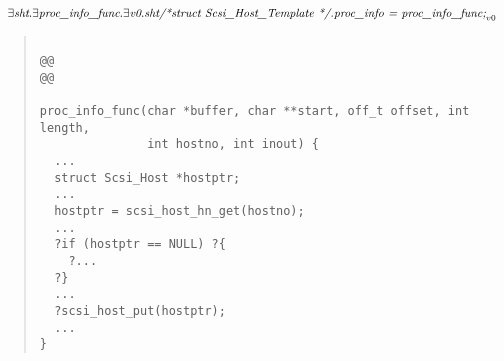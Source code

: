\documentclass{article}
\newcommand{\mita}[1]{\mbox{\it{{#1}}}}
\begin{document}
\[\begin{array}{l}
\exists \mita{sht} . \exists \mita{proc\_info\_func} . \exists \mita{v0} . \mita{sht/*struct Scsi\_Host\_Template */.proc\_info = proc\_info\_func;}_{v0}
\end{array}\]

\begin{quote}\begin{verbatim}

@@
@@

proc_info_func(char *buffer, char **start, off_t offset, int length,
               int hostno, int inout) {
  ...
  struct Scsi_Host *hostptr;
  ...
  hostptr = scsi_host_hn_get(hostno);
  ...
  ?if (hostptr == NULL) ?{
    ?...
  ?}
  ...
  ?scsi_host_put(hostptr);
  ...
}
\end{verbatim}\end{quote}
\end{document}
